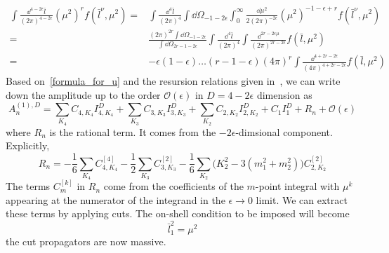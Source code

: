 \begin{equation}\label{formula_for_mu}
\begin{split}
\int\frac{\dd^{4-2\epsilon} \bar{l}}{(2\pi)^{4-2\epsilon}} (\mu^2)^rf(
\bar{l}^\nu,\mu^2) 
= & \int\frac{\dd^{4} \bar{l}}{(2\pi)^{4}} \int \dd\Omega_{-1-2\epsilon}\int_0^\infty \frac{\dd \mu^2}{2(2\pi)^{-2\epsilon}}(\mu^2)^{-1-\epsilon +r}f(\bar{l}^\nu, \mu^2)
\\ 
= & \frac{(2\pi)^{2r}\int\dd\Omega_{-1-2\epsilon}}{\int\dd\Omega_{2r-1-2\epsilon}} 
\int\frac{\dd^4 \bar{l}}{(2\pi)^4}\int\frac{\dd^{2r-2\epsilon \mu}}{(2\pi)^{2r-2\epsilon}}f(\bar{l},\mu^2)
\\
= &
-\epsilon(1-\epsilon)\ldots(r-1-\epsilon)(4\pi)^{r}\int\frac{\dd^{4+2r-2\epsilon}}{(4\pi)^{4+2r-2\epsilon}}f(\bar{l},\mu^2)
\end{split}
\end{equation}
Based on~\cref{formula_for_u} and the resursion relations given in~\cite{Bern:1993kr}, we can write down the amplitude up to the order $\mathcal{O}(\epsilon)$ in $D = 4-2\epsilon$ dimension as
\begin{equation*}
A_n^{(1),D} = \sum_{K_4}C_{4,K_4} I_{4,K_4}^{D} +
\sum_{K_3}C_{3,K_3} I_{3,K_3}^{D}+
\sum_{K_2}C_{2,K_2} I_{2,K_2}^{D}+
C_1 I_1^{D} + R_n + \mathcal{O}(\epsilon)
\end{equation*}
where $R_n$ is the rational term. It comes from the $-2\epsilon$-dimsional component.
\\
Explicitly,
\begin{equation*}
R_n = -\frac{1}{6}\sum_{K_4}C_{4,K_4}^{[4]} - \frac{1}{2}\sum_{K_3}C_{3,K_3}^{[2]} - 
\frac{1}{6}\sum_{K_2}\big(K_2^2 - 3(m_1^2 + m_2^2)\big)C_{2,K_2}^{[2]}
\end{equation*}
The terms $C_m^{[k]}$ in $R_n$ come from the coefficients of the $m$-point integral with $\mu^k$ appearing at the numerator of the integrand in the $\epsilon\rightarrow 0 $ limit.
We can extract these terms by applying cuts. 
The on-shell condition to be imposed will become
\begin{equation*}
\bar{l}_1^2 = \mu^2
\end{equation*}
\ie the cut propagators are now massive.
%
%
